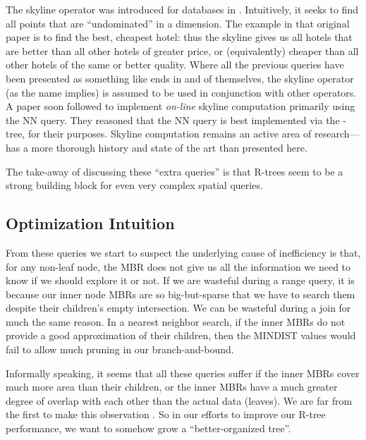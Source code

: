 The skyline operator was introduced for databases in \cite{borzsonykossmannstocker01}.
Intuitively, it seeks to find all points that are ``undominated'' in a dimension.
The example in that original paper is to find the best, cheapest hotel: thus the skyline gives us all hotels that are better than all other hotels of greater price, or (equivalently) cheaper than all other hotels of the same or better quality.
Where all the previous queries have been presented as something like ends in and of themselves, the skyline operator (as the name implies) is assumed to be used in conjunction with other operators.
A paper soon followed to implement \emph{on-line} skyline computation primarily using the NN query\cite{kossmannramsakrost02}.
They reasoned that the NN query is best implemented via the \rstar-tree, for their purposes.
Skyline computation remains an active area of research---\cite{zhangalhajj10} has a more thorough history and state of the art than presented here.

The take-away of discussing these ``extra queries'' is that R-trees seem to be a strong building block for even very complex spatial queries.

\subsection{Optimization Intuition}

From these queries we start to suspect the underlying cause of inefficiency is that, for any non-leaf node, the MBR does not give us all the information we need to know if we should explore it or not.
If we are wasteful during a range query, it is because our inner node MBRs are so big-but-sparse that we have to search them despite their children's empty intersection.
We can be wasteful during a join for much the same reason.
In a nearest neighbor search, if the inner MBRs do not provide a good approximation of their children, then the MINDIST values would fail to allow much pruning in our branch-and-bound.

Informally speaking, it seems that all these queries suffer if the inner MBRs cover much more area than their children, or the inner MBRs have a much greater degree of overlap with each other than the actual data (leaves).
We are far from the first to make this observation \cite{gaedegunther98}.
So in our efforts to improve our R-tree performance, we want to somehow grow a ``better-organized tree''.




